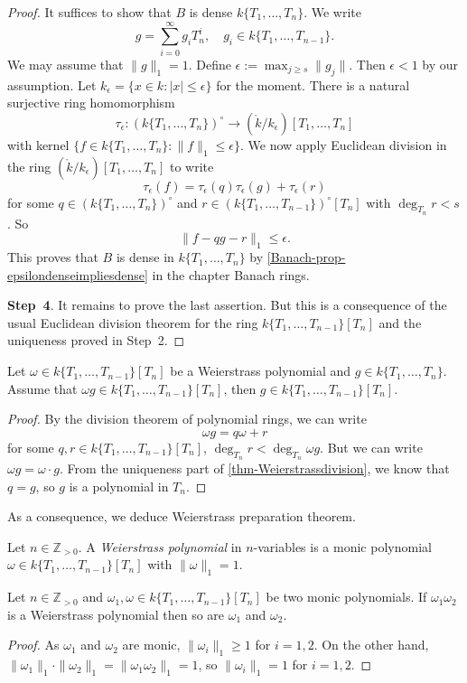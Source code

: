 \begin{proof}
    It suffices to show that $B$ is dense $k\{T_1,\ldots,T_{n}\}$. We write 
    \[
      g=\sum_{i=0}^{\infty}g_i T_n^{i},\quad g_i\in k\{T_1,\ldots,T_{n-1}\}.  
    \]
    We may assume that $\|g\|_1=1$.
    Define $\epsilon:=\max_{j\geq s} \|g_j\|$. Then $\epsilon<1$ by our assumption. Let $k_{\epsilon}=\{x\in k:|x|\leq \epsilon\}$ for the moment. There is a natural surjective ring homomorphism 
    \[
        \tau_{\epsilon}:(k\{T_1,\ldots,T_n\} )^{\circ}\rightarrow (\mathring{k}/k_{\epsilon})[T_1,\ldots,T_n]
    \] 
    with kernel $\{f\in k\{T_1,\ldots,T_n\}  : \|f\|_1\leq \epsilon\}$.  We now apply Euclidean division in the ring $(\mathring{k}/k_{\epsilon})[T_1,\ldots,T_n]$ to write
    \[
        \tau_{\epsilon}(f)=\tau_{\epsilon}(q)\tau_{\epsilon}(g)+\tau_{\epsilon}(r)
    \]
    for some $q\in (k\{T_1,\ldots,T_n\} )^{\circ}$ and $r\in (k\{T_1,\ldots,T_{n-1}\} )^{\circ}[T_n]$ with $\deg_{T_n}r<s$. So
    \[
        \|f-qg-r\|_1\leq \epsilon.  
    \]
    This proves that $B$ is dense in $k\{T_1,\ldots,T_{n}\}$ by \cref{Banach-prop-epsilondenseimpliesdense} in the chapter Banach rings.

    \textbf{Step~4}. It remains to prove the last assertion. But this is a consequence of the usual Euclidean division theorem for the ring $k\{T_1,\ldots,T_{n-1}\}[T_n]$ and the uniqueness proved in Step~2.
\end{proof}
\begin{lemma}\label{lma-Weierstrasspolycancel2}
    Let $\omega\in k\{ T_1,\ldots,T_{n-1}\}[T_n] $ be a Weierstrass polynomial and $g\in k\{ T_1,\ldots,T_{n}\}$. Assume that $\omega g\in k\{ T_1,\ldots,T_{n-1}\}[T_n]$, then $g\in k\{ T_1,\ldots,T_{n-1}\}[T_n]$.
\end{lemma}
\begin{proof}
    By the division theorem of polynomial rings, we can write
    \[
        \omega g = q\omega+r  
    \]
    for some $q,r\in k\{ T_1,\ldots,T_{n-1}\}[T_n]$, $\deg_{T_n}r<\deg_{T_n}\omega g$. But we can write $\omega g= \omega \cdot g$. From the uniqueness part of \cref{thm-Weierstrassdivision}, we know that $q=g$, so $g$ is a polynomial in $T_n$.
\end{proof}

As a consequence, we deduce Weierstrass preparation theorem.
\begin{definition}
    Let $n\in \mathbb{Z}_{>0}$. A \emph{Weierstrass polynomial} in $n$-variables is a monic polynomial $\omega\in k\{T_1,\ldots,T_{n-1}\}[T_n]$ with $\|\omega\|_1=1$.
\end{definition}
\begin{lemma}\label{lma-Weierstrassfact}
    Let $n\in \mathbb{Z}_{>0}$ and $\omega_1,\omega\in k\{T_1,\ldots,T_{n-1}\}[T_n]$ be two monic polynomials. If $\omega_1\omega_2$ is a Weierstrass polynomial then so are $\omega_1$ and $\omega_2$.
\end{lemma}
\begin{proof}
    As $\omega_1$ and $\omega_2$ are monic, $\|\omega_i\|_1\geq 1$ for $i=1,2$. On the other hand, $\|\omega_1\|_1\cdot\|\omega_2\|_1=\|\omega_1\omega_2\|_1=1$, so $\|\omega_i\|_1= 1$ for $i=1,2$.
\end{proof}

